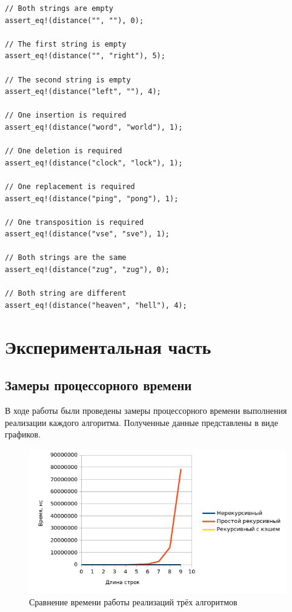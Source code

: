 \documentclass{report}
\begin{document}
\begin{lstlisting}[caption=Тесты реализаций алгоритмов]
// Both strings are empty
assert_eq!(distance("", ""), 0);

// The first string is empty
assert_eq!(distance("", "right"), 5);

// The second string is empty
assert_eq!(distance("left", ""), 4);

// One insertion is required
assert_eq!(distance("word", "world"), 1);

// One deletion is required
assert_eq!(distance("clock", "lock"), 1);

// One replacement is required
assert_eq!(distance("ping", "pong"), 1);

// One transposition is required
assert_eq!(distance("vse", "sve"), 1);

// Both strings are the same
assert_eq!(distance("zug", "zug"), 0);

// Both string are different
assert_eq!(distance("heaven", "hell"), 4);
\end{lstlisting}

\chapter{Экспериментальная часть}

\section{Замеры процессорного времени}

В ходе работы были проведены замеры процессорного времени
выполнения реализации каждого алгоритма. Полученные данные
представлены в виде графиков.

\begin{figure}[ht]
    \centering
    \includegraphics[width=\textwidth]{plt-01.png}
    \caption{Сравнение времени работы реализаций трёх алгоритмов}
\end{figure}
\end{document}
